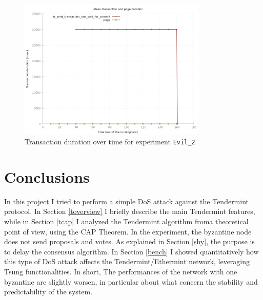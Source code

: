 \documentclass[]{article}
\begin{document}
\begin{figure}[h]
	\centering
	\includegraphics[width=0.8\textwidth]{images/graphes-Transactions-mean-evil_2.png}
	\caption{\label{tm_evil-2} Transaction duration over time for experiment \texttt{Evil\_2}}
\end{figure}


\section{Conclusions}
In this project I tried to perform a simple DoS attack against the Tendermint protocol. In Section \ref{toverview} I briefly describe the main Tendermint features, while in Section \ref{tcap} I analyzed the Tendermint algorithm froma theoretical point of view, using the CAP Theorem. In the experiment, the byzantine node does not send proposals and votes. As explained in Section \ref{shy}, the purpose is to delay the consensus algorithm. In Section \ref{bench} I showed quantitatively how this type of DoS attack affects the Tendermint/Ethermint network, leveraging Tsung functionalities.
In short, The performances of the network with one byzantine are slightly worsen, in particular about what concern the stability and predictability of the system.

	
\end{document}
